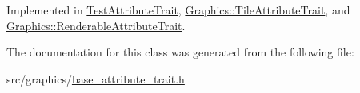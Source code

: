 Implemented in \hyperlink{class_test_attribute_trait_af121ef5fbd5bcda4bbbc7fdadd5599c8}{Test\+Attribute\+Trait}, \hyperlink{class_graphics_1_1_tile_attribute_trait_a5c217a080f9b52799ad6c9e2ffaa06f5}{Graphics\+::\+Tile\+Attribute\+Trait}, and \hyperlink{class_graphics_1_1_renderable_attribute_trait_a44401f624ace1dc71220e7064db92465}{Graphics\+::\+Renderable\+Attribute\+Trait}.



The documentation for this class was generated from the following file\+:\begin{DoxyCompactItemize}
\item 
src/graphics/\hyperlink{base__attribute__trait_8h}{base\+\_\+attribute\+\_\+trait.\+h}\end{DoxyCompactItemize}
